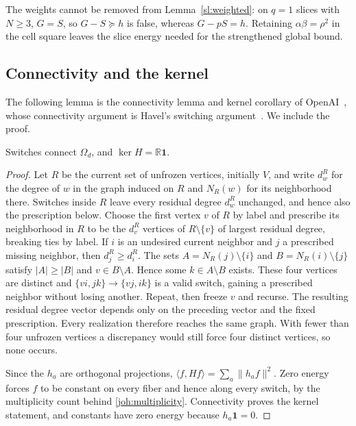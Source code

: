 \begin{remark}\label{asm:weighting}
The weights cannot be removed from Lemma~\ref{sl:weighted}: on $q=1$ slices
with $N\ge3$, $G=S$, so $G-S\succeq h$ is false, whereas $G-pS=h$. Retaining
$\alpha\beta=\rho^2$ in the cell square leaves the slice energy needed for
the strengthened global bound.
\end{remark}

\subsection{Connectivity and the kernel}
The following lemma is the connectivity lemma and kernel corollary of
OpenAI~\cite[Lemma~7.2, Corollary~7.3]{OAI26}, whose connectivity argument
is Havel's switching argument~\cite[Theorem~3]{Havel55}. We include the
proof.

\begin{lemma}\label{asm:kernel}
Switches connect $\Omega_d$, and $\ker H=\mathbb R\mathbf 1$.
\end{lemma}
\begin{proof}
Let $R$ be the current set of unfrozen vertices, initially $V$, and write
$d^R_w$ for the degree of $w$ in the graph induced on $R$ and $N_R(w)$ for
its neighborhood there. Switches inside $R$ leave every residual degree
$d^R_w$ unchanged, and hence also the prescription below. Choose the first
vertex $v$ of $R$ by label and prescribe its neighborhood in $R$ to be the
$d^R_v$ vertices of $R\setminus\{v\}$ of largest residual degree, breaking
ties by label. If $i$ is an undesired current neighbor and $j$ a prescribed
missing neighbor, then $d^R_j\ge d^R_i$. The sets
$A=N_R(j)\setminus\{i\}$ and $B=N_R(i)\setminus\{j\}$ satisfy $|A|\ge|B|$
and $v\in B\setminus A$. Hence some $k\in A\setminus B$ exists. These four
vertices are distinct and $\{vi,jk\}\to\{vj,ik\}$ is a valid switch, gaining
a prescribed neighbor without losing another. Repeat, then freeze $v$ and
recurse. The resulting residual degree vector depends only on the preceding
vector and the fixed prescription. Every realization therefore reaches the
same graph. With fewer than four unfrozen vertices a discrepancy would still
force four distinct vertices, so none occurs.

Since the $h_a$ are orthogonal projections,
$\langle f,Hf\rangle=\sum_a\lVert h_af\rVert^2$. Zero energy forces $f$ to be
constant on every fiber and hence along every switch, by the multiplicity
count behind \eqref{joh:multiplicity}. Connectivity proves the kernel
statement, and constants have zero energy because $h_a\mathbf 1=0$.
\end{proof}

